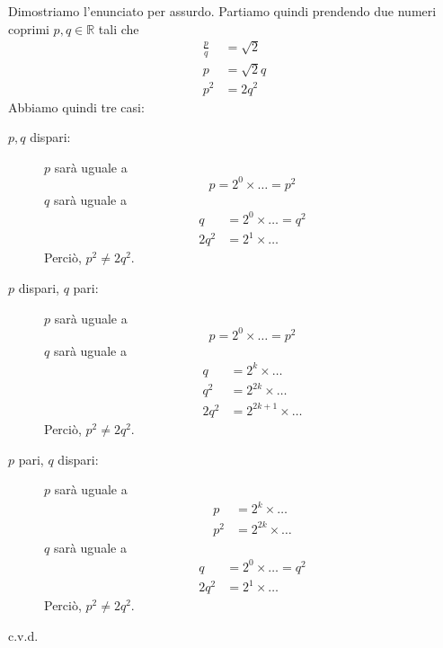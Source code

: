 \documentclass[../../dimostrazioni]{subfiles}
\begin{document}
            Dimostriamo l'enunciato per assurdo.
            Partiamo quindi prendendo due numeri coprimi \(p, q \in \mathbb{R}\) tali che
            \begin{align*}
                \frac{p}{q} &= \sqrt{2}\\
                p &= \sqrt{2} q\\
                p^2 &= 2 q^2
            \end{align*}
            Abbiamo quindi tre casi:
            \begin{description}
                \item[\(p, q\) dispari:]
                    \(p\) sarà uguale a
                    \[
                        p = 2^0 \times \dots = p^2
                    \]
                    \(q\) sarà uguale a
                    \begin{align*}
                        q &= 2^0 \times \dots = q^2\\
                        2q^2 &= 2^1 \times \dots
                    \end{align*}
                    Perciò, \(p^2 \neq 2q^2\).
                \item[\(p\) dispari, \(q\) pari:]
                    \(p\) sarà uguale a
                    \[
                        p = 2^0 \times \dots = p^2
                    \]
                    \(q\) sarà uguale a
                    \begin{align*}
                        q &= 2^k \times \dots\\
                        q^2 &= 2^{2k} \times \dots\\
                        2q^2 &= 2^{2k + 1} \times \dots
                    \end{align*}
                    Perciò, \(p^2 \neq 2q^2\).
                \newpage
                \item[\(p\) pari, \(q\) dispari:]
                    \(p\) sarà uguale a
                    \begin{align*}
                        p &= 2^k \times \dots\\
                        p^2 &= 2^{2k} \times \dots
                    \end{align*}
                    \(q\) sarà uguale a
                    \begin{align*}
                        q &= 2^0 \times \dots = q^2\\
                        2q^2 &= 2^1 \times \dots
                    \end{align*}
                    Perciò, \(p^2 \neq 2q^2\).
            \end{description}
            c.v.d.
            
\end{document}
